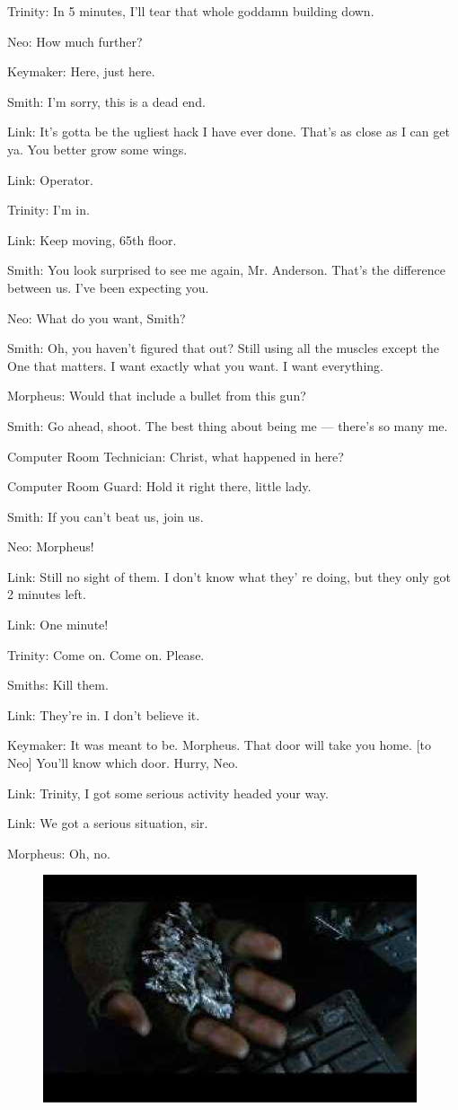 \documentclass[UTF8]{ctexart}
\newenvironment{myquote}{\color{green} \setlength{\leftskip}{6em} \setlength{\rightskip}{4em} \setlength{\parindent}{-2em}}{\par}
\begin{document}
\begin{myquote}
Trinity: In 5 minutes, I'll tear that whole goddamn building down.

Neo: How much further?

Keymaker: Here, just here.

Smith: I'm sorry, this is a dead end.

Link: It's gotta be the ugliest hack I have ever done. That's as close as I can get ya. You better grow some wings.

Link: Operator.

Trinity: I'm in.

Link: Keep moving, 65th floor.

Smith: You look surprised to see me again, Mr. Anderson. That's the difference between us. I've been expecting you.

Neo: What do you want, Smith?

Smith: Oh, you haven't figured that out? Still using all the muscles except the One that matters. I want exactly what you want. I want everything.

Morpheus: Would that include a bullet from this gun?

Smith: Go ahead, shoot. The best thing about being me --- there's so many me.

Computer Room Technician: Christ, what happened in here?

Computer Room Guard: Hold it right there, little lady.

Smith: If you can't beat us, join us.

Neo: Morpheus!

Link: Still no sight of them. I don't know what they' re doing, but they only got 2 minutes left.

Link: One minute!

Trinity: Come on. Come on. Please.

Smiths: Kill them.

Link: They're in. I don't believe it.

Keymaker: It was meant to be. Morpheus. That door will take you home. [to Neo] You'll know which door. Hurry, Neo.

Link: Trinity, I got some serious activity headed your way.

Link: We got a serious situation, sir.

Morpheus: Oh, no.
\end{myquote}

\begin{figure}[htb]
\centering
\includegraphics[width=0.5\linewidth]{fig/read_reloaded-147}
\end{figure}
\end{document}
